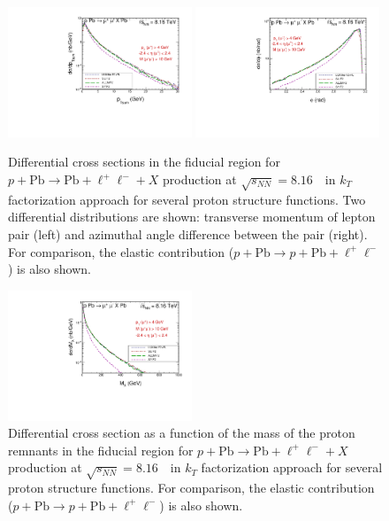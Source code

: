 \begin{figure}[!h]
\includegraphics[width=0.49\textwidth]{figures_Marta/ptsum-c-N.pdf}
 \includegraphics[width=0.49\textwidth]{figures_Marta/phi-c-N.pdf}
\caption{Differential cross sections in the fiducial region for $p+\textrm{Pb}\rightarrow \textrm{Pb} + \ell^+\ell^- + X$ production at $\sqrt{s_{N N}} = 8.16$~\TeV\ in $k_T$ factorization approach for several proton structure functions.
Two differential distributions are shown: transverse momentum of lepton pair (left) and azimuthal angle difference between the pair (right).
For comparison, the elastic contribution ($p+\textrm{Pb}\rightarrow p+ \textrm{Pb} + \ell^+\ell^-$) is also shown.
}
 \label{fig:kt_figures2}
\end{figure}


\begin{figure}[!h]

 \includegraphics[width=0.49\textwidth]{figures_Marta/MX-c-NN.pdf}
\caption{Differential cross section as a function of the mass of the proton remnants in the fiducial region for $p+\textrm{Pb}\rightarrow \textrm{Pb} + \ell^+\ell^- + X$ production at $\sqrt{s_{N N}} = 8.16$~\TeV\ in $k_T$ factorization approach for several proton structure functions.
For comparison, the elastic contribution ($p+\textrm{Pb}\rightarrow p+ \textrm{Pb} + \ell^+\ell^-$) is also shown.
}
 \label{fig:kt_figures3}
\end{figure}






